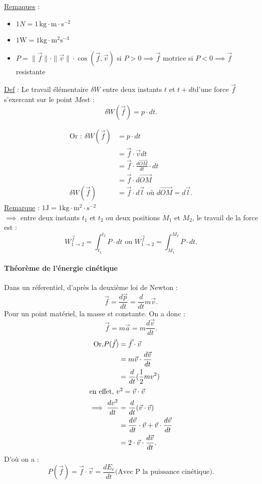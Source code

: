 \documentclass{article}
\begin{document}
\underline{Remaques}  : 
\begin{itemize}
    \item $1 N = 1 \, \text{kg} \cdot \text{m} \cdot \text{s}^{-2}$
    \item \(1\text{W} = 1\text{kg}\cdot \text{m}^2\text{s}^{-3}\)
    \item \(P = \|\vec{f}\|\cdot  \|\vec{v}\|\cdot \cos(\vec{f},\vec{v})\)
    \subitem  si \(P>0 \implies \vec{f}\) motrice
    \subitem  si \(P<0 \implies \vec{f}\) resistante
\end{itemize}

\underline{Def} : Le travail élémentaire \(\delta W\) entre deux instants   \(t\) et \(t+dt\)d'une force \(\vec{f}\) s'exercant sur le point \(M\)est : \\

\[
\delta W (\vec{f}) = p\cdot dt
.\] 

\begin{align*}
    \text{Or : } \delta W (\vec{f}) &= p\cdot dt \\
    &= \vec{f}\cdot \vec{v}dt \\
    &= \vec{f} \cdot \frac{d\vec{OM}}{dt} \cdot dt \\
    &= \vec{f}\cdot d\vec{OM} \\
    \delta W(\vec{f}) &= \vec{f}\cdot d\vec{l} \text{ où } d\vec{OM} = d\vec{l}
.\end{align*}
\underline{Remarque} : \(1\text{J} = 1\text{kg}\cdot \text{m}^2\cdot \text{s}^{-2}\)\\
\(\implies\) entre deux instants \(t_1\text{ et }t_2\) ou deux positions \(M_1\) et \(M_2\), le travail de la force est : \\
\[
W^{\vec{f}}_{1 \to 2} = \int_{t_1}^{t_2} P\cdot dt \text{ ou } W^{\vec{f}}_{1 \to 2} = \int_{M_1}^{M_2} P\cdot dt   
.\] 

\paragraph{Théorème de l'énergie cinétique}
Dans un réferentiel, d'après la deuxième loi de Newton : \\
\[
\vec{f} = \frac{d\vec{p}}{dt} = \frac{d}{dt} m\vec{v}
.\] 
Pour un point matériel, la masse st constante. On a donc : 
\[
\vec{f} = m\vec{a} = m \frac{d\vec{v}}{dt} 
.\] 
\begin{align*}
    \text{Or,} P(\vec{f}) &= \vec{f}\cdot \vec{v} \\
    &= m\vec{v} \cdot \frac{d\vec{v}}{dt} \\
    &= \frac{d}{dt}(\frac{1}{2}mv^2) \\
    \intertext{en effet, $v^2 = \vec{v}\cdot \vec{v}$}
    \implies \frac{dv^2}{dt} &= \frac{d}{dt}(\vec{v}\cdot \vec{v})\\
    &= \frac{d\vec{v}}{dt}\cdot \vec{v} + \vec{v}\cdot \frac{d\vec{v}}{dt} \\
    &= 2\cdot \vec{v}\cdot \frac{d\vec{v}}{dt}
.\end{align*} 
D'où on a : \\
\[
P(\vec{f}) = \vec{f}\cdot \vec{v} = \frac{dE_c}{dt} \text{(Avec P la puissance cinétique)}
.\] 
\end{document}
